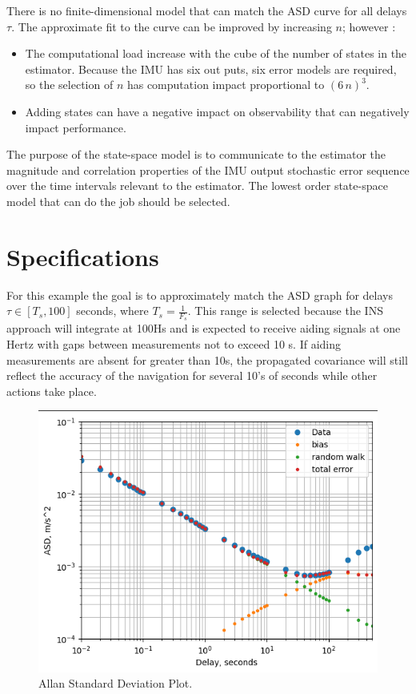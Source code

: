 \documentclass[letter,twocolumn]{article}
\begin{document}
There is no finite-dimensional model that can match the ASD curve for all delays $\tau$.
The approximate fit to the curve can be improved by increasing $n$; however \cite{CSM_IMU}:
\begin{itemize}
	\item The computational load increase with the cube of the number of states in the estimator. Because the IMU has six out puts, six error models are required, so the selection of $n$ has computation impact proportional to $(6\, n)^3.$
	\item Adding states can have a negative impact on observability that can negatively impact performance.
\end{itemize} 
The purpose of the state-space model is to communicate to the estimator the magnitude and correlation properties 
of the IMU output stochastic error sequence over the time intervals relevant to the estimator. 
The lowest order state-space model that can do the job should be selected.


\section{Specifications}
For this example the goal is to approximately match the ASD graph for delays $\tau\in[T_s, 100]$ seconds, where $T_s = \frac{1}{F_s}$. This range is selected because the INS approach will integrate at 100Hs and is expected to receive aiding signals at one Hertz with gaps between measurements not to exceed 10 s. 
If aiding measurements are absent for greater than 10s, the propagated covariance will still reflect the accuracy of the navigation for several 10's of seconds while other actions take place. 


\begin{figure}[tbh]
	\centering
	\includegraphics[trim=0in 0in 0in 0.1in, clip, width=0.9\columnwidth]{figure/ASD_plot}
	\caption{Allan Standard Deviation Plot.}
	\label{fig:ASD_plot}
\end{figure}
\end{document}
